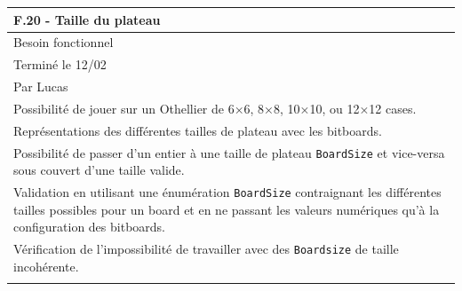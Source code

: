 \documentclass[a4paper,12pt]{article}
\begin{document}
\vspace{1cm}

\noindent
\setlength{\arrayrulewidth}{1.5pt}
\renewcommand{\arraystretch}{1.5}
\begin{tabularx}{\textwidth}{|X|}
    \hline
    \textbf{F.20 - Taille du plateau}                                                                                                                                                                    \\
    \hline
    Besoin fonctionnel                                                                                                                                                                                   \\
    \hline
    Terminé le 12/02                                                                                                                                                                                     \\
    Par Lucas                                                                                                                                                                                            \\
    \hline
    Possibilité de jouer sur un Othellier de 6×6, 8×8, 10×10, ou 12×12 cases.                                                                                                                            \\
    Représentations des différentes tailles de plateau avec les bitboards.                                                                                                                               \\
    Possibilité de passer d’un entier à une taille de plateau \texttt{BoardSize} et vice-versa sous couvert d’une taille valide.                                                                         \\
    \arrayrulecolor{MediumAquamarine}\hline
    \arrayrulecolor{CornflowerBlue}
    Validation en utilisant une énumération \texttt{BoardSize} contraignant les différentes tailles possibles pour un board et en ne passant les valeurs numériques qu’à la configuration des bitboards. \\
    Vérification de l’impossibilité de travailler avec des \texttt{Boardsize} de taille incohérente.                                                                                                     \\
    \arrayrulecolor{MediumAquamarine}\hline

\end{tabularx}
\end{document}
